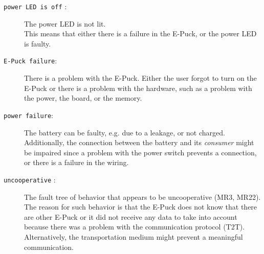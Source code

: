 \documentclass[a4paper,parskip,headheight=38pt]{scrartcl} %
\begin{document}
\begin{description}
\item[\texttt{power LED is off} :]
    The power LED is not lit. \\
    This means that either there is a failure in the E-Puck, or the power LED is faulty.
\item[\texttt{E-Puck failure}:]
    There is a problem with the E-Puck. 
    Either the user forgot to turn on the E-Puck or there is a problem with the hardware, such as a problem with the power, the board, or the memory.
\item[\texttt{power failure}:]
    The battery can be faulty, e.g. due to a leakage, or not charged. Additionally, the connection between the battery and its \textit{consumer} might be impaired since a problem with the power switch prevents a connection, or there is a failure in the wiring.
\item[\texttt{uncooperative} :]
    The fault tree of behavior that appears to be uncooperative (MR3, MR22). \\
    The reason for such behavior is that the E-Puck does not know that there are other E-Puck or it did not receive any data to take into account because there was a problem with the communication protocol (T2T). 
    Alternatively, the transportation medium might prevent a meaningful communication.


\end{description}
\end{document}
